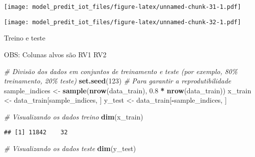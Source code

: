 \documentclass[
]{article}
\newenvironment{Shaded}{\begin{snugshade}}{\end{snugshade}}
\newcommand{\CommentTok}[1]{\textcolor[rgb]{0.56,0.35,0.01}{\textit{#1}}}
\newcommand{\DecValTok}[1]{\textcolor[rgb]{0.00,0.00,0.81}{#1}}
\newcommand{\FloatTok}[1]{\textcolor[rgb]{0.00,0.00,0.81}{#1}}
\newcommand{\FunctionTok}[1]{\textcolor[rgb]{0.13,0.29,0.53}{\textbf{#1}}}
\newcommand{\NormalTok}[1]{#1}
\newcommand{\OtherTok}[1]{\textcolor[rgb]{0.56,0.35,0.01}{#1}}
\newcommand{\SpecialCharTok}[1]{\textcolor[rgb]{0.81,0.36,0.00}{\textbf{#1}}}
\newcommand{\StringTok}[1]{\textcolor[rgb]{0.31,0.60,0.02}{#1}}
\begin{document}
\texttt{[image: model\_predit\_iot\_files/figure-latex/unnamed-chunk-31-1.pdf]}

\begin{Shaded}
\end{Shaded}

\texttt{[image: model\_predit\_iot\_files/figure-latex/unnamed-chunk-32-1.pdf]}

Treino e teste

OBS: Colunas alvos são RV1 RV2

\begin{Shaded}
\begin{Highlighting}[]
\CommentTok{\# Divisão dos dados em conjuntos de treinamento e teste (por exemplo, 80\% treinamento, 20\% teste)}
\FunctionTok{set.seed}\NormalTok{(}\DecValTok{123}\NormalTok{)  }\CommentTok{\# Para garantir a reprodutibilidade}
\NormalTok{sample\_indices }\OtherTok{\textless{}{-}} \FunctionTok{sample}\NormalTok{(}\FunctionTok{nrow}\NormalTok{(data\_train), }\FloatTok{0.8} \SpecialCharTok{*} \FunctionTok{nrow}\NormalTok{(data\_train))}
\NormalTok{x\_train }\OtherTok{\textless{}{-}}\NormalTok{ data\_train[sample\_indices, ]}
\NormalTok{y\_test }\OtherTok{\textless{}{-}}\NormalTok{ data\_train[}\SpecialCharTok{{-}}\NormalTok{sample\_indices, ]}
\end{Highlighting}
\end{Shaded}

\begin{Shaded}
\begin{Highlighting}[]
\CommentTok{\# Visualizando os dados treino}
\FunctionTok{dim}\NormalTok{(x\_train)}
\end{Highlighting}
\end{Shaded}

\begin{verbatim}
## [1] 11842    32
\end{verbatim}

\begin{Shaded}
\begin{Highlighting}[]
\CommentTok{\# Visualizando os dados teste}
\FunctionTok{dim}\NormalTok{(y\_test)}
\end{Highlighting}
\end{Shaded}
\end{document}
